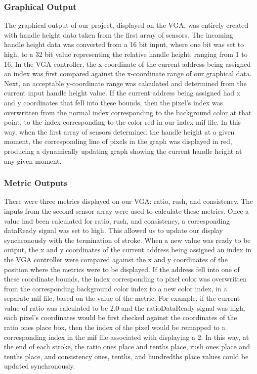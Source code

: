 \documentclass[letterpaper]{article} %
\begin{document}
\subsubsection{Graphical Output}
The graphical output of our project, displayed on the VGA, was entirely created with handle height data taken from the first array of sensors. The incoming handle height data was converted from a 16 bit input, where one bit was set to high, to a 32 bit value representing the relative handle height, ranging from 1 to 16.
In the VGA controller, the x-coordinate of the current address being assigned an index was first compared against the x-coordinate range of our graphical data. Next, an acceptable y-coordinate range was calculated and determined from the current input handle height value. If the current address being assigned had x and y coordinates that fell into these bounds, then the pixel's index was overwritten from the normal index corresponding to the background color at that point, to the index corresponding to the color red in our index mif file. In this way, when the first array of sensors determined the handle height at a given moment, the corresponding line of pixels in the graph was displayed in red, producing a dynamically updating graph showing the current handle height at any given moment.
\subsubsection{Metric Outputs}
There were three metrics displayed on our VGA: ratio, rush, and consistency. The inputs from the second sensor array were used to calculate these metrics. Once a value had been calculated for ratio, rush, and consistency, a corresponding dataReady signal was set to high. This allowed us to update our display synchronously with the termination of stroke. When a new value was ready to be output, the x and y coordinates of the current address being assigned an index in the VGA controller were compared against the x and y coordinates of the position where the metrics were to be displayed. If the address fell into one of these coordinate bounds, the index corresponding to pixel color was overwritten from the corresponding background color index to a new color index, in a separate mif file, based on the value of the metric. For example, if the current value of ratio was calculated to be 2.0 and the ratioDataReady signal was high, each pixel's coordinates would be first checked against the coordinates of the ratio ones place box, then the index of the pixel would be remapped to a corresponding index in the mif file associated with displaying a 2. In this way, at the end of each stroke, the ratio ones place and tenths place, rush ones place and tenths place, and consistency ones, tenths, and hundredths place values could be updated synchronously.
\end{document}
